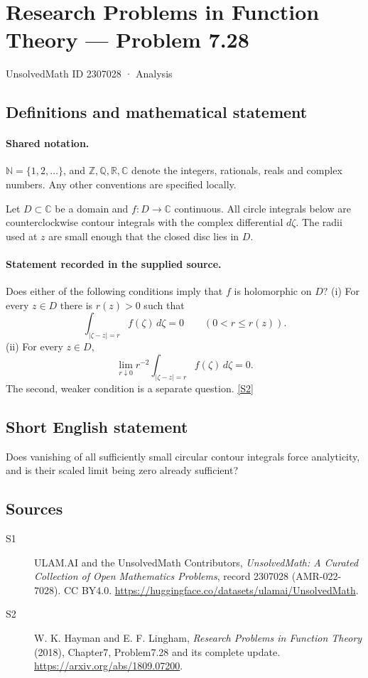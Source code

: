 \documentclass[11pt]{article}
\newcommand{\sref}[2]{\hyperlink{source:#1:#2}{[S#2]}}
\begin{document}
\setcounter{section}{2307027}
\section{Research Problems in Function Theory — Problem 7.28}\label{2307028}
{\small\sffamily UnsolvedMath ID 2307028 · Analysis}
\subsection{Definitions and mathematical statement}

\paragraph{Shared notation.}$\mathbb N=\{1,2,\ldots\}$, and $\mathbb Z,\mathbb Q,\mathbb R,\mathbb C$ denote the integers, rationals, reals and complex numbers. Any other conventions are specified locally.


Let $D\subset\mathbb C$ be a domain and $f:D\to\mathbb C$ continuous. All circle integrals below are counterclockwise contour integrals with the complex differential $d\zeta$. The radii used at $z$ are small enough that the closed disc lies in $D$.

\paragraph{Statement recorded in the supplied source.}
Does either of the following conditions imply that $f$ is holomorphic on $D$?
(i) For every $z\in D$ there is $r(z)>0$ such that
\[\int_{|\zeta-z|=r}f(\zeta)\,d\zeta=0\qquad(0<r\le r(z)).\]
(ii) For every $z\in D$,
\[\lim_{r\downarrow0}r^{-2}\int_{|\zeta-z|=r}f(\zeta)\,d\zeta=0.\]
The second, weaker condition is a separate question. \sref{2307028}{2}

\subsection{Short English statement}
Does vanishing of all sufficiently small circular contour integrals force analyticity, and is their scaled limit being zero already sufficient?
\subsection{Sources}
\begin{description}
\item[\hypertarget{source:2307028:1}{S1}] ULAM.AI and the UnsolvedMath Contributors, \emph{UnsolvedMath: A Curated Collection of Open Mathematics Problems}, record 2307028 (AMR-022-7028). CC BY4.0. \url{https://huggingface.co/datasets/ulamai/UnsolvedMath}.
\item[\hypertarget{source:2307028:2}{S2}] W. K. Hayman and E. F. Lingham, \emph{Research Problems in Function Theory} (2018), Chapter7, Problem7.28 and its complete update. \url{https://arxiv.org/abs/1809.07200}.
\end{description}
\label{end:2307028}
\end{document}
